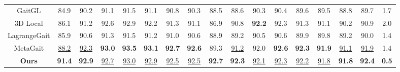 \documentclass[10pt,twocolumn,letterpaper]{article}
\begin{document}
\begin{table}[tbp]
{\begin{tabular}{c|cccccccccccccc|c|c}
    GaitGL \cite{lin2021gait} & 84.9  & 90.2  & 91.1  & 91.5  & 91.1  & 90.8  & 90.3  & 88.5  & 88.6  & 90.3  & 90.4  & 89.6  & 89.5  & 88.8  & 89.7&1.7 \\

    3D Local \cite{huang20213d} & 86.1  & 91.2  & 92.6  & 92.9  & 92.2  & 91.3  & 91.1  & 86.9  & 90.8  & \textbf{92.2}  & 92.3  & 91.3  & 91.1  & 90.2  & 90.9&2.0 \\

    LagrangeGait \cite{chai2022lagrange} & 85.9  & 90.6  & 91.3  & 91.5  & 91.2  & 91.0    & 90.6  & 88.9  & 89.2  & 90.5  & 90.6  & 89.9  & 89.8  & 89.2  & 90.0 & 1.4\\

    MetaGait \cite{dou2022metagait} & \underline{88.2}  & \underline{92.3}  & \textbf{93.0}  & \textbf{93.5}  & \textbf{93.1}  & \textbf{92.7}    & \textbf{92.6}  & 89.3  & \underline{91.2}  & 92.0  & \textbf{92.6}  & \textbf{92.3}  & \textbf{91.9}  & \underline{91.1}  & \underline{91.9} & 1.4 \\
    \hline
    \textbf{Ours}  &   \textbf{91.4}    &  \textbf{92.9}     &   \underline{92.7}    &  \underline{93.0}     &  \underline{92.9}     &   \underline{92.5}    &  \underline{92.5}     &  \textbf{92.7}     &   \textbf{92.3}    &   \underline{92.1}    &  \underline{92.3}     &   \underline{92.2}    &  \underline{91.8}     &   \textbf{91.8}    & \textbf{92.4} & \textbf{0.5}\\
    \bottomrule
    \end{tabular}%
  \label{tab:sota-ou}%
  }
\end{table}%

\begin{table}[htbp]
  \centering
  \setlength{\abovecaptionskip}{0cm}  %
\setlength{\belowcaptionskip}{-0.2cm} %
  \caption{Rank-1 accuracy (\%), Rank-5 accuracy (\%), Rank-10 accuracy (\%), Rank-20 accuracy (\%) on GREW.}
  \label{tab:grew}%
\end{table}%
\end{document}
